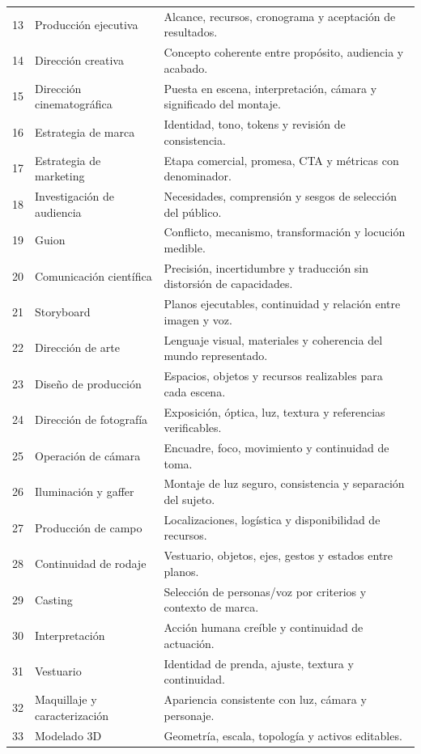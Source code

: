 {\begin{longtable}{p{.05\linewidth}p{.25\linewidth}p{.56\linewidth}}
13 & Producción ejecutiva & Alcance, recursos, cronograma y aceptación de resultados.\\
14 & Dirección creativa & Concepto coherente entre propósito, audiencia y acabado.\\
15 & Dirección cinematográfica & Puesta en escena, interpretación, cámara y significado del montaje.\\
16 & Estrategia de marca & Identidad, tono, tokens y revisión de consistencia.\\
17 & Estrategia de marketing & Etapa comercial, promesa, CTA y métricas con denominador.\\
18 & Investigación de audiencia & Necesidades, comprensión y sesgos de selección del público.\\
19 & Guion & Conflicto, mecanismo, transformación y locución medible.\\
20 & Comunicación científica & Precisión, incertidumbre y traducción sin distorsión de capacidades.\\
21 & Storyboard & Planos ejecutables, continuidad y relación entre imagen y voz.\\
22 & Dirección de arte & Lenguaje visual, materiales y coherencia del mundo representado.\\
23 & Diseño de producción & Espacios, objetos y recursos realizables para cada escena.\\
24 & Dirección de fotografía & Exposición, óptica, luz, textura y referencias verificables.\\
25 & Operación de cámara & Encuadre, foco, movimiento y continuidad de toma.\\
26 & Iluminación y gaffer & Montaje de luz seguro, consistencia y separación del sujeto.\\
27 & Producción de campo & Localizaciones, logística y disponibilidad de recursos.\\
28 & Continuidad de rodaje & Vestuario, objetos, ejes, gestos y estados entre planos.\\
29 & Casting & Selección de personas/voz por criterios y contexto de marca.\\
30 & Interpretación & Acción humana creíble y continuidad de actuación.\\
31 & Vestuario & Identidad de prenda, ajuste, textura y continuidad.\\
32 & Maquillaje y caracterización & Apariencia consistente con luz, cámara y personaje.\\
33 & Modelado 3D & Geometría, escala, topología y activos editables.\\

\end{longtable}}
